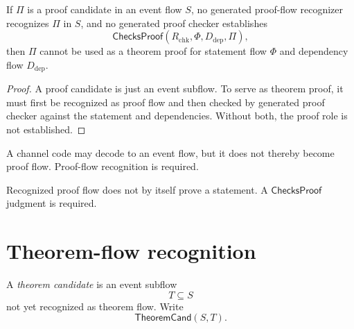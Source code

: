 \begin{theorem}
\label{thm:theorem-proof-candidate-insufficient}
If $\Pi$ is a proof candidate in an event flow $S$, no generated proof-flow recognizer recognizes $\Pi$ in $S$, and no generated proof checker establishes
$$
  \mathsf{ChecksProof}(R_{\mathrm{chk}},\Phi,D_{\mathrm{dep}},\Pi),
$$
then $\Pi$ cannot be used as a theorem proof for statement flow $\Phi$ and dependency flow $D_{\mathrm{dep}}$.
\end{theorem}

\begin{proof}
A proof candidate is just an event subflow. To serve as theorem proof, it must first be recognized as proof flow and then checked by generated proof checker against the statement and dependencies. Without both, the proof role is not established.
\end{proof}

\begin{corollary}
\label{cor:theorem-proof-code-not-proof-flow}
A channel code may decode to an event flow, but it does not thereby become proof flow. Proof-flow recognition is required.
\end{corollary}

\begin{corollary}
\label{cor:theorem-proof-proof-flow-not-checking}
Recognized proof flow does not by itself prove a statement. A $\mathsf{ChecksProof}$ judgment is required.
\end{corollary}

\section{Theorem-flow recognition}
\label{sec:theorem-proof-theorem-flow}

\begin{definition}
\label{def:theorem-proof-theorem-candidate}
A \emph{theorem candidate} is an event subflow
$$
  T\subseteq S
$$
not yet recognized as theorem flow. Write
$$
  \mathsf{TheoremCand}(S,T).
$$
\end{definition}

